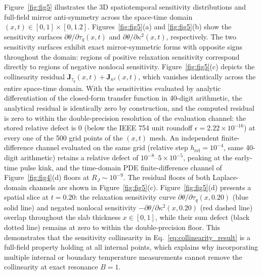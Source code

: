 \documentclass[preprint,12pt]{elsarticle}
\begin{document}
Figure~\ref{fig:fig5} illustrates the 3D spatiotemporal sensitivity distributions and full-field mirror anti-symmetry across the space-time domain $(x, t) \in [0, 1] \times [0, 1.2]$. Figures~\ref{fig:fig5}(a) and \ref{fig:fig5}(b) show the sensitivity surfaces $\partial \theta / \partial \tau_q(x, t)$ and $\partial \theta / \partial \kappa^2(x, t)$, respectively. The two sensitivity surfaces exhibit exact mirror-symmetric forms with opposite signs throughout the domain: regions of positive relaxation sensitivity correspond directly to regions of negative nonlocal sensitivity. Figure~\ref{fig:fig5}(c) depicts the collinearity residual $\mathbf{J}_{\tau_q}(x, t) + \mathbf{J}_{\kappa^2}(x, t)$, which vanishes identically across the entire space-time domain. With the sensitivities evaluated by analytic differentiation of the closed-form transfer function in 40-digit arithmetic, the analytical residual is identically zero by construction, and the computed residual is zero to within the double-precision resolution of the evaluation channel: the stored relative defect is $0$ (below the IEEE 754 unit roundoff $\epsilon = 2.22 \times 10^{-16}$) at every one of the 500 grid points of the $(x, t)$ mesh. An independent finite-difference channel evaluated on the same grid (relative step $h_{\mathrm{rel}} = 10^{-4}$, same 40-digit arithmetic) retains a relative defect of $10^{-8}$--$5 \times 10^{-5}$, peaking at the early-time pulse kink, and the time-domain PDE finite-difference channel of Figure~\ref{fig:fig4}(d) floors at $R_J \sim 10^{-9}$. The residual floors of both Laplace-domain channels are shown in Figure~\ref{fig:fig5}(c). Figure~\ref{fig:fig5}(d) presents a spatial slice at $t = 0.20$: the relaxation sensitivity curve $\partial \theta / \partial \tau_q(x, 0.20)$ (blue solid line) and negated nonlocal sensitivity $-\partial \theta / \partial \kappa^2(x, 0.20)$ (red dashed line) overlap throughout the slab thickness $x \in [0, 1]$, while their sum defect (black dotted line) remains at zero to within the double-precision floor. This demonstrates that the sensitivity collinearity in Eq.~\eqref{eq:collinearity_result} is a full-field property holding at all internal points, which explains why incorporating multiple internal or boundary temperature measurements cannot remove the collinearity at exact resonance $B = 1$.
\end{document}
